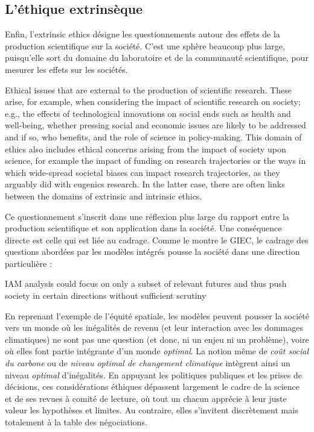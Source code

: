 \subsection{L'éthique extrinsèque}

Enfin, l'\gls{extrinsic ethics} désigne les questionnements autour des effets de la production scientifique sur la société. C'est une sphère beaucoup plus large, puisqu'elle sort du domaine du laboratoire et de la communauté scientifique, pour mesurer les effets sur les sociétés. 

\begin{authoredquote}
Ethical issues that are external to the production of scientific research. These arise, for example, when considering the impact of scientific research on society; e.g., the effects of technological innovations on social ends such as health and well-being, whether pressing social and economic issues are likely to be addressed and if so, who benefits, and the role of science in policy-making. This domain of ethics also includes ethical concerns arising from the impact of society upon science, for example the impact of funding on research trajectories or the ways in which wide-spread societal biases can impact research trajectories, as they arguably did with eugenics research. In the latter case, there are often links between the domains of extrinsic and intrinsic ethics.
\end{authoredquote}

Ce questionnement s'inscrit dans une réflexion plus large du rapport entre la production scientifique et son application dans la société.  Une conséquence directe est celle qui est liée au cadrage. Comme le montre le GIEC, le cadrage des questions abordées par les modèles intégrés pousse la société dans une direction particulière : 

\begin{authoredquote}
     IAM analysis could focus on only a subset of relevant futures and thus push society in certain directions without sufficient scrutiny 
\end{authoredquote}

En reprenant l'exemple de l'équité spatiale, les modèles peuvent pousser la société vers un monde où les inégalités de revenu (et leur interaction avec les dommages climatiques) ne sont pas une question (et donc, ni un enjeu ni un problème), voire où elles font partie intégrante d'un monde \emph{optimal}. La notion même de \emph{coût social du carbone} ou de \emph{niveau optimal de changement climatique} intègrent ainsi un niveau \emph{optimal} d'inégalités. En appuyant les politiques publiques et les prises de décisions, ces considérations éthiques dépassent largement le cadre de la science et de ses revues à comité de lecture, où tout un chacun apprécie à leur juste valeur les hypothèses et limites. Au contraire, elles s'invitent discrètement mais totalement à la table des négociations. 

